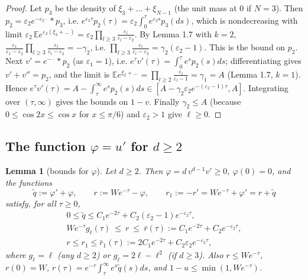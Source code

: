\documentclass[11pt,a4paper]{article}
\newtheorem{lemma}[theorem]{Lemma}
\theoremstyle{definition}
\theoremstyle{remark}
\begin{document}
\begin{proof}
Let $p_3$ be the density of $\xi_3+\dots+\xi_{N-1}$ (the unit mass at $0$ if $N=3$). Then $p_2=\varepsilon_2e^{-\varepsilon_2\cdot}*p_3$, i.e. $e^{\varepsilon_2\tau}p_2(\tau)=\varepsilon_2\int_0^\tau e^{\varepsilon_2s}p_3(ds)$, which is nondecreasing with limit $\varepsilon_2\,\mathbb E e^{\varepsilon_2(\xi_3+\dots)}=\varepsilon_2\prod_{l\ge3}\frac{\varepsilon_l}{\varepsilon_l-\varepsilon_2}$. By Lemma 1.7 with $k=2$, $\frac{\varepsilon_1}{\varepsilon_1-\varepsilon_2}\prod_{l\ge3}\frac{\varepsilon_l}{\varepsilon_l-\varepsilon_2}=-\gamma_2$, i.e. $\prod_{l\ge3}\frac{\varepsilon_l}{\varepsilon_l-\varepsilon_2}=\gamma_2(\varepsilon_2-1)$. This is the bound on $p_2$. Next $v'=e^{-\cdot}*p_2$ (as $\varepsilon_1=1$), i.e. $e^{\tau}v'(\tau)=\int_0^\tau e^sp_2(s)ds$; differentiating gives $v'+v''=p_2$, and the limit is $\mathbb Ee^{\xi_2+\dots}=\prod_{l\ge2}\frac{\varepsilon_l}{\varepsilon_l-1}=\gamma_1=A$ (Lemma 1.7, $k=1$). Hence $e^\tau v'(\tau)=A-\int_\tau^\infty e^sp_2(s)ds\in[A-\gamma_2\varepsilon_2e^{-(\varepsilon_2-1)\tau},A]$. Integrating over $(\tau,\infty)$ gives the bounds on $1-v$. Finally $\gamma_2\le A$ (because $0\le\cos2x\le\cos x$ for $x\le\pi/6$) and $\varepsilon_2>1$ give $\ell\ge0$.
\end{proof}

\subsection{The function $\varphi=u'$ for $d\ge2$}

\begin{lemma}[{bounds for $\varphi$}]
Let $d\ge2$. Then $\varphi=d\,v^{d-1}v'\ge0$, $\varphi(0)=0$, and the functions
\begin{equation*}
\tilde q:=\varphi'+\varphi,\qquad r:=We^{-\tau}-\varphi,\qquad r_1:=-r'=We^{-\tau}+\varphi'=r+\tilde q
\end{equation*}
satisfy, for all $\tau\ge0$,
\begin{gather*}
0\le\tilde q\le C_1e^{-2\tau}+C_2(\varepsilon_2-1)e^{-\varepsilon_2\tau}, \\
We^{-\tau}g_\ell(\tau)\ \le\ r\ \le\ \bar r(\tau):=C_1e^{-2\tau}+C_2e^{-\varepsilon_2\tau}, \\
r\le r_1\le\bar r_1(\tau):=2C_1e^{-2\tau}+C_2\varepsilon_2e^{-\varepsilon_2\tau},
\end{gather*}
where $g_\ell=\ell$ (any $d\ge2$) or $g_\ell=2\ell-\ell^2$ (if $d\ge3$). Also $r\le We^{-\tau}$, $r(0)=W$, $r(\tau)=e^{-\tau}\int_\tau^\infty e^s\tilde q(s)ds$, and $1-u\le\min(1,We^{-\tau})$.
\end{lemma}
\end{document}

